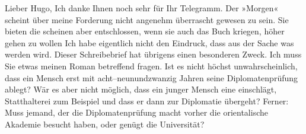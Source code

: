 \pstart{}Lieber Hugo,\pend\vspace{0.5em}
\pstart
           Ich danke Ihnen noch sehr für Ihr Telegramm. Der »Morgen« scheint über meine Forderung nicht angenehm überrascht gewesen zu
               sein. Sie bieten die \label{T_L01707-1v}\label{T_L01707-1}
               scheinen aber entschlossen, wenn sie auch das Buch kriegen, höher gehen zu wollen{\dotstwo} Ich habe eigentlich nicht den Eindruck, dass aus der Sache was werden
               wird. Dieser Schreibebrief hat übrigens einen besonderen Zweck. Ich muss Sie etwas
               meinen Roman betreffend
               fragen. Ist es nicht höchst unwahrscheinlich, dass ein Mensch erst mit
               acht–neunundzwanzig Jahren seine Diplomatenprüfung ablegt? Wär es aber nicht möglich,
               dass ein junger Mensch eine \label{T_L01707-2v}\label{T_L01707-2} einschlägt, Statthalterei zum Beispiel
               und dass er dann zur Diplomatie übergeht? Ferner: Muss jemand, der die
               Diplomatenprüfung macht vorher die orientalische
                  Akademie besucht haben, oder genügt die Universität?\pend
           \endnumbering{}  
      